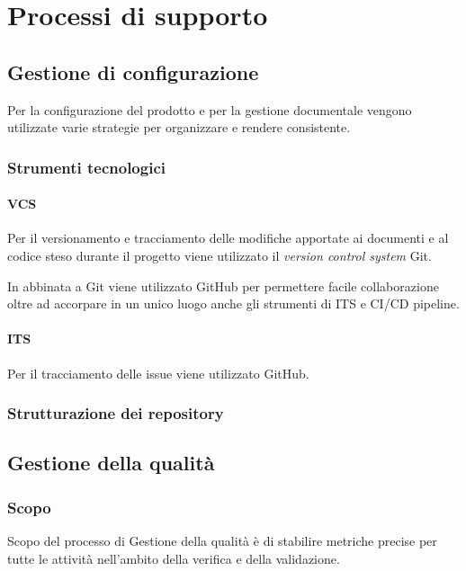 \chapter{Processi di supporto}


\section{Gestione di configurazione}\label{s:configurazione}

Per la configurazione del prodotto e per la gestione documentale vengono utilizzate varie strategie per organizzare e rendere consistente.

\subsection{Strumenti tecnologici}

\subsubsection{VCS}\label{sss:vcs} Per il versionamento e tracciamento delle modifiche apportate ai documenti e al codice steso durante il progetto viene utilizzato il \textit{version control system} Git. 

In abbinata a Git viene utilizzato GitHub per permettere facile collaborazione oltre ad accorpare in un unico luogo anche gli strumenti di ITS e CI/CD pipeline.

\subsubsection{ITS} Per il tracciamento delle issue viene utilizzato GitHub.

\subsection{Strutturazione dei repository}

\section{Gestione della qualità}\label{s:qualità}
\subsection{Scopo}
Scopo del processo di Gestione della qualità è di stabilire metriche precise per tutte le attività nell’ambito della verifica e della validazione.

